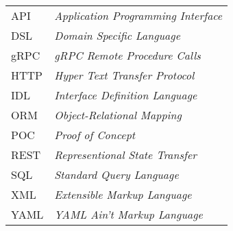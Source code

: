 \begin{longtable}{ll}
  API & \textit{Application Programming Interface} \\
  DSL & \textit{Domain Specific Language} \\
  gRPC & \textit{gRPC Remote Procedure Calls} \\
  HTTP & \textit{Hyper Text Transfer Protocol} \\
  IDL & \textit{Interface Definition Language} \\
  ORM & \textit{Object-Relational Mapping} \\
  POC & \textit{Proof of Concept} \\
  REST & \textit{Representional State Transfer} \\
  SQL & \textit{Standard Query Language} \\
  XML & \textit{Extensible Markup Language} \\
  YAML & \textit{YAML Ain't Markup Language} \\
\end{longtable}

